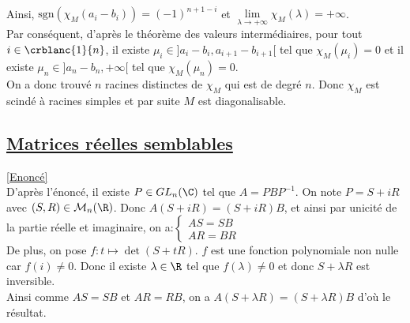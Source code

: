 \documentclass[8pt]{book}
\begin{document}
	\\Ainsi, $\text{sgn}(\chi_M(a_i-b_i))=(-1)^{n+1-i}$ et $\lim\limits_{\lambda\to+\infty}\chi_M(\lambda)=+\infty$.
	\\Par conséquent, d'après le théorème des valeurs intermédiaires, pour tout $i\in\crblanc{1}{n}$, il existe $\mu_i\in]a_i-b_i,a_{i+1}-b_{i+1}[$ tel que $\chi_M(\mu_i)=0$ et il existe $\mu_n\in]a_n-b_n,+\infty[$ tel que $\chi_M(\mu_n)=0$.
	\\On a donc trouvé $n$ racines distinctes de $\chi_M$ qui est de degré $n$. Donc $\chi_M$ est scindé à racines simples et par suite $M$ est diagonalisable.
	
	\subsection{\underline{Matrices réelles semblables} }
	\label{Matrices réelles semblables corrigé}
	\textcolor{blue}{\hyperref[Matrices réelles semblables]{[Enoncé]}}\\
	D'après l'énoncé, il existe $P\in GL_n(\C)$ tel que $A=PBP^{-1}$. On note $P=S+iR$ avec $(S,R)\in\mathcal{M}_n(\R)$.
	Donc $A(S+iR)=(S+iR)B$, et ainsi par unicité de la partie réelle et imaginaire, on a:$\begin{cases}
		AS=SB\\
		AR=BR
	\end{cases}$\\
	De plus, on pose $f:t\mapsto \det(S+tR)$. $f$ est une fonction polynomiale non nulle car $f(i)\ne0$. Donc il existe $\lambda\in\R$ tel que $f(\lambda)\ne0$ et donc $S+\lambda R$ est inversible.
	\\Ainsi comme $AS=SB$ et $AR=RB$, on a $A(S+\lambda R)=(S+\lambda R)B$ d'où le résultat.
	
\end{document}
